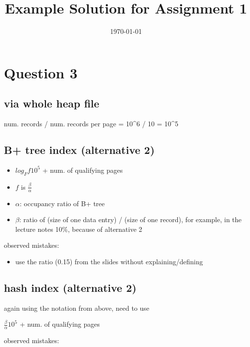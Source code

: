 \documentclass{article}
\title{Example Solution for Assignment 1}
\author{}
\date{\mydate\today}
\providecommand{\tightlist}{%
  \setlength{\itemsep}{0pt}\setlength{\parskip}{0pt}}
\begin{document}
\maketitle





\section{Question 3}\label{question-3}

\subsection{via whole heap file}\label{via-whole-heap-file}

num. records / num. records per page = 10\^{}6 / 10 = 10\^{}5

\subsection{B+ tree index (alternative
2)}\label{b-tree-index-alternative-2}

\begin{itemize}
\tightlist
\item
  \(log_F f 10^5\) + num. of qualifying pages
\item
  \(f\) is \(\frac{\beta}{\alpha}\)
\item
  \(\alpha\): occupancy ratio of B+ tree
\item
  \(\beta\): ratio of (size of one data entry) / (size of one record),
  for example, in the lecture notes 10\%, because of alternative 2
\end{itemize}

observed mistakes:

\begin{itemize}
\tightlist
\item
  use the ratio (0.15) from the slides without explaining/defining
\end{itemize}

\subsection{hash index (alternative 2)}\label{hash-index-alternative-2}

again using the notation from above, need to use

\(\frac{\beta}{\alpha} 10^5\) + num. of qualifying pages

observed mistakes:
\end{document}
